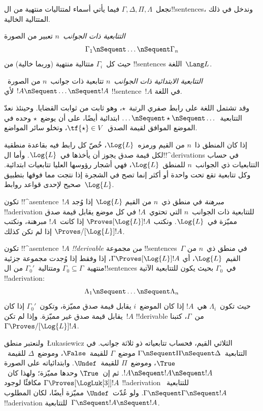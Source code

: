 \documentclass[../../../include/open-logic-section]{subfiles}
\begin{document}


نجعل~$\Gamma, \Delta, \Pi, \Lambda$ فيما يأتي أسماء لمتتاليات
منتهية من ال!!{sentence}s، وندخل في ذلك المتتالية الخالية.

\begin{defn}[التتابعية]
\emph{التتابعية ذات الجوانب~$n$} تعبير من الصورة
\[
\Gamma_1 \nSequent \dots \nSequent \Gamma_n
\]
حيث كل~$\Gamma_i$ متتالية منتهية (وربما خالية) من !!{sentence}s
اللغة~$\Lang L$.
\end{defn}

\begin{defn}
\emph{التتابعية الابتدائية ذات الجوانب~$n$} تتابعية ذات جوانب~$n$ من
الصورة~$!A \nSequent \dots \nSequent !A$ لأي !!{sentence}~$!A$ في
اللغة.

وقد تشتمل اللغة على رابط صفري الرتبة~$\star$، وهو ثابت من ثوابت
القضايا. وحينئذ نعدّ التتابعية~$\dots \nSequent \star \nSequent \dots$
ابتدائية أيضًا، على أن يوضع~$\star$ وحده في الموضع الموافق لقيمة
الصدق~$\tf{\star} \in V$، وتخلو سائر المواضع.
\end{defn}

إذا كان المنطق ذا~$n$ من القيم ورمزه~$\Log{L}$، خُصّ كل رابط فيه
بقاعدة منطقية لكل قيمة صدق يجوز أن يأخذها في~$\Log{L}$.
وأما ال!!^{derivation}s في حساب التتابعيات ذي الجوانب~$n$ للمنطق~$\Log{L}$،
فهي أشجار رؤوسها العليا تتابعيات ابتدائية. وكل تتابعية تقع تحت واحدة
أو أكثر إنما تصح في الشجرة إذا نتجت مما فوقها بتطبيق صحيح لإحدى
قواعد روابط~$\Log{L}$.

\begin{defn}[المبرهنات]
تكون !!^a{sentence}~$!A$ \emph{مبرهنة} في منطق ذي~$n$ من القيم
$\Log{L}$ إذا وُجد !!a{derivation} للتتابعية ذات الجوانب~$n$ التي
تحتوي~$!A$ في كل موضع يقابل قيمة صدق مميّزة في~$\Log{L}$. ونكتب
$\Proves[\Log{L}] !A$ إذا كانت~$!A$ مبرهنة، ونكتب
$\Proves/[\Log{L}] !A$ إذا لم تكن كذلك.
\end{defn}

\begin{defn}[!!^{derivability}]
تكون !!^a{sentence}~$!A$ \emph{!!{derivable} من} مجموعة
!!{sentence}s~$\Gamma$ في منطق ذي~$n$ من القيم~$\Log{L}$، أي
$\Gamma \Proves[\Log{L}] !A$، إذا وفقط إذا وُجدت مجموعة جزئية
منتهية~$\Gamma_0 \subseteq \Gamma$ ومتتالية~$\Gamma_0'$ من
ال!!{sentence}s في~$\Gamma_0$ بحيث يكون للتتابعية الآتية
!!a{derivation}:
\[ \Lambda_1 \nSequent \dots \nSequent \Lambda_n \]
حيث تكون~$\Lambda_i$ هي~$!A$ إذا كان الموضع~$i$ يقابل قيمة صدق
مميّزة، وتكون~$\Gamma_0'$ إذا كان يقابل قيمة صدق غير مميّزة. وإذا لم
تكن~$!A$ !!{derivable} من~$\Gamma$، كتبنا
$\Gamma \Proves/[\Log{L}] !A$.
\end{defn}

ولنعتبر منطق~\L ukasiewicz الثلاثي القيم، فحساب تتابعياته ذو ثلاثة
جوانب. في التتابعية~$\Gamma \nSequent \Pi \nSequent \Delta$
موضع~$\Gamma$ للقيمة~$\False$، وموضع~$\Delta$ للقيمة~$\True$،
وموضع~$\Pi$ للقيمة~$\Undef$. وابتدائياته على الصورة
$!A \nSequent !A \nSequent !A$. ثم إن~$\True$ وحدها مميّزة؛
ولهذا كان~$\Gamma \Proves[\LogLuk[3]] !A$ مكافئًا لوجود
!!a{derivation} للتتابعية~$\Gamma \nSequent \Gamma \nSequent !A$.
ولو عُدّت~$\Undef$ مميّزة أيضًا، لكان المطلوب !!a{derivation}
للتتابعية~$\Gamma \nSequent !A \nSequent !A$.
\end{document}
